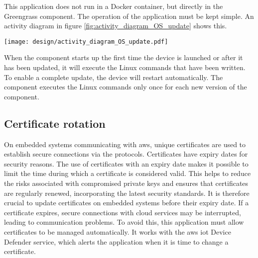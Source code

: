 This application does not run in a Docker container, but directly in the Greengrass component. The operation of the application must be kept simple. An activity diagram in figure \ref{fig:activity_diagram_OS_update} shows this.
\begin{center}
    \begingroup
    \texttt{[image: design/activity\_diagram\_OS\_update.pdf]}
    \label{fig:activity_diagram_OS_update}
    \endgroup
\end{center}
When the component starts up the first time the device is launched or after it has been updated, it will execute the Linux commands that have been written. To enable a complete update, the device will restart automatically. The component executes the Linux commands only once for each new version of the component.

\subsection{Certificate rotation}
On embedded systems communicating with \gls{aws}, unique certificates are used to establish secure connections via the protocols. Certificates have expiry dates for security reasons. The use of certificates with an expiry date makes it possible to limit the time during which a certificate is considered valid. This helps to reduce the risks associated with compromised private keys and ensures that certificates are regularly renewed, incorporating the latest security standards. It is therefore crucial to update certificates on embedded systems before their expiry date. If a certificate expires, secure connections with \gls{cloud} services may be interrupted, leading to communication problems. To avoid this, this application must allow certificates to be managed automatically. It works with the \gls{aws} \acrshort{iot} Device Defender service, which alerts the application when it is time to change a certificate.

